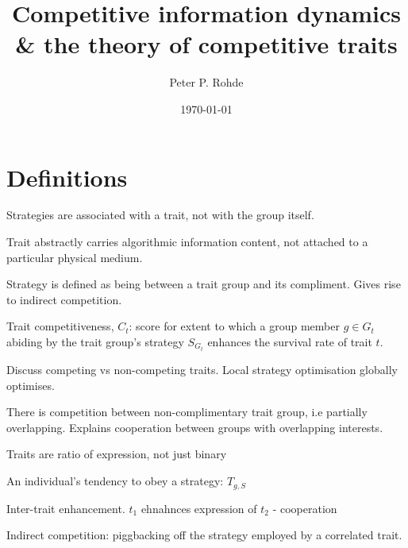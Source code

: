 \documentclass[aps,rmp,twocolumn,amsmath,amssymb,nofootinbib,superscriptaddress]{revtex4}
\begin{document}


%
%

\title{Competitive information dynamics \& the theory of competitive traits}

%
%

\author{Peter P. Rohde}

\date{\today}

\frenchspacing

%
%

\begin{abstract}
\end{abstract}

\maketitle

\tableofcontents

\section{Definitions}

Strategies are associated with a trait, not with the group itself.

Trait abstractly carries algorithmic information content, not attached to a particular physical medium.

Strategy is defined as being between a trait group and its compliment. Gives rise to indirect competition.

Trait competitiveness, $C_t$: score for extent to which a group member $g\in G_t$ abiding by the trait group's strategy $S_{G_t}$ enhances the survival rate of trait $t$.

Discuss competing vs non-competing traits. Local strategy optimisation globally optimises.

There is competition between non-complimentary trait group, i.e partially overlapping. Explains cooperation between groups with overlapping interests.

Traits are ratio of expression, not just binary

An individual's tendency to obey a strategy: $T_{g,S}$

Inter-trait enhancement. $t_1$ ehnahnces expression of $t_2$ - cooperation

Indirect competition: piggbacking off the strategy employed by a correlated trait.
\end{document}
